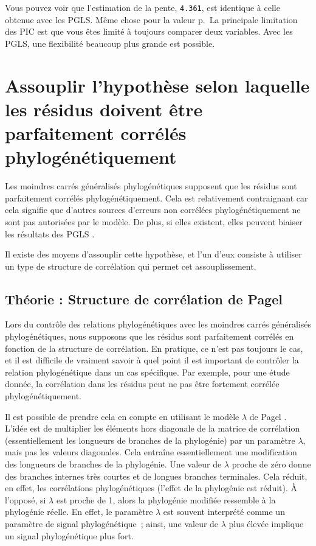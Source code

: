 \documentclass[
]{book}
\begin{document}
Vous pouvez voir que l'estimation de la pente, \texttt{4.361}, est identique à celle obtenue avec les PGLS. Même chose pour la valeur p.~La principale limitation des PIC est que vous êtes limité à toujours comparer deux variables. Avec les PGLS, une flexibilité beaucoup plus grande est possible.

\chapter{Assouplir l'hypothèse selon laquelle les résidus doivent être parfaitement corrélés phylogénétiquement}\label{assouplir-lhypothuxe8se-selon-laquelle-les-ruxe9sidus-doivent-uxeatre-parfaitement-corruxe9luxe9s-phyloguxe9nuxe9tiquement}

Les moindres carrés généralisés phylogénétiques supposent que les résidus sont parfaitement corrélés phylogénétiquement. Cela est relativement contraignant car cela signifie que d'autres sources d'erreurs non corrélées phylogénétiquement ne sont pas autorisées par le modèle. De plus, si elles existent, elles peuvent biaiser les résultats des PGLS \citep{revell2010phylogenetic}.

Il existe des moyens d'assouplir cette hypothèse, et l'un d'eux consiste à utiliser un type de structure de corrélation qui permet cet assouplissement.

\section{Théorie : Structure de corrélation de Pagel}\label{thuxe9orie-structure-de-corruxe9lation-de-pagel}

Lors du contrôle des relations phylogénétiques avec les moindres carrés généralisés phylogénétiques, nous supposons que les résidus sont parfaitement corrélés en fonction de la structure de corrélation. En pratique, ce n'est pas toujours le cas, et il est difficile de vraiment savoir à quel point il est important de contrôler la relation phylogénétique dans un cas spécifique. Par exemple, pour une étude donnée, la corrélation dans les résidus peut ne pas être fortement corrélée phylogénétiquement.

Il est possible de prendre cela en compte en utilisant le modèle \(\lambda\) de Pagel \citep{pagel1999inferring}. L'idée est de multiplier les éléments hors diagonale de la matrice de corrélation (essentiellement les longueurs de branches de la phylogénie) par un paramètre \(\lambda\), mais pas les valeurs diagonales. Cela entraîne essentiellement une modification des longueurs de branches de la phylogénie. Une valeur de \(\lambda\) proche de zéro donne des branches internes très courtes et de longues branches terminales. Cela réduit, en effet, les corrélations phylogénétiques (l'effet de la phylogénie est réduit). À l'opposé, si \(\lambda\) est proche de 1, alors la phylogénie modifiée ressemble à la phylogénie réelle. En effet, le paramètre \(\lambda\) est souvent interprété comme un paramètre de signal phylogénétique~; ainsi, une valeur de \(\lambda\) plus élevée implique un signal phylogénétique plus fort.
\end{document}
